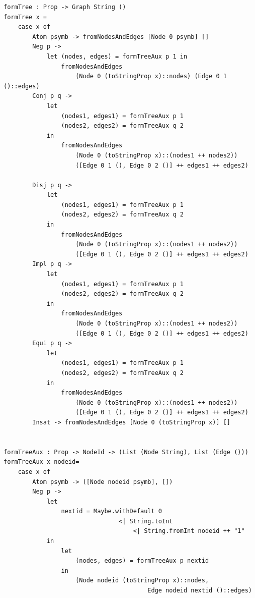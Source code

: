 \documentclass[a4paper]{report}
\begin{document}
\begin{lstlisting}[caption= Definición de las funciones \textit{formTree} y \textit{formTree2DOT}]
formTree : Prop -> Graph String ()
formTree x =
    case x of
        Atom psymb -> fromNodesAndEdges [Node 0 psymb] []
        Neg p -> 
            let (nodes, edges) = formTreeAux p 1 in
                fromNodesAndEdges 
                    (Node 0 (toStringProp x)::nodes) (Edge 0 1 ()::edges)
        Conj p q -> 
            let 
                (nodes1, edges1) = formTreeAux p 1
                (nodes2, edges2) = formTreeAux q 2
            in
                fromNodesAndEdges 
                    (Node 0 (toStringProp x)::(nodes1 ++ nodes2)) 
                    ([Edge 0 1 (), Edge 0 2 ()] ++ edges1 ++ edges2)

        Disj p q -> 
            let 
                (nodes1, edges1) = formTreeAux p 1
                (nodes2, edges2) = formTreeAux q 2
            in
                fromNodesAndEdges 
                    (Node 0 (toStringProp x)::(nodes1 ++ nodes2)) 
                    ([Edge 0 1 (), Edge 0 2 ()] ++ edges1 ++ edges2)
        Impl p q -> 
            let 
                (nodes1, edges1) = formTreeAux p 1
                (nodes2, edges2) = formTreeAux q 2
            in
                fromNodesAndEdges 
                    (Node 0 (toStringProp x)::(nodes1 ++ nodes2)) 
                    ([Edge 0 1 (), Edge 0 2 ()] ++ edges1 ++ edges2)
        Equi p q -> 
            let 
                (nodes1, edges1) = formTreeAux p 1
                (nodes2, edges2) = formTreeAux q 2
            in
                fromNodesAndEdges 
                    (Node 0 (toStringProp x)::(nodes1 ++ nodes2)) 
                    ([Edge 0 1 (), Edge 0 2 ()] ++ edges1 ++ edges2)
        Insat -> fromNodesAndEdges [Node 0 (toStringProp x)] []


formTreeAux : Prop -> NodeId -> (List (Node String), List (Edge ()))
formTreeAux x nodeid=
    case x of
        Atom psymb -> ([Node nodeid psymb], [])
        Neg p -> 
            let 
                nextid = Maybe.withDefault 0 
                                <| String.toInt 
                                    <| String.fromInt nodeid ++ "1" 
            in
                let 
                    (nodes, edges) = formTreeAux p nextid 
                in
                    (Node nodeid (toStringProp x)::nodes, 
                                        Edge nodeid nextid ()::edges)                               
        

\end{lstlisting}
\end{document}
